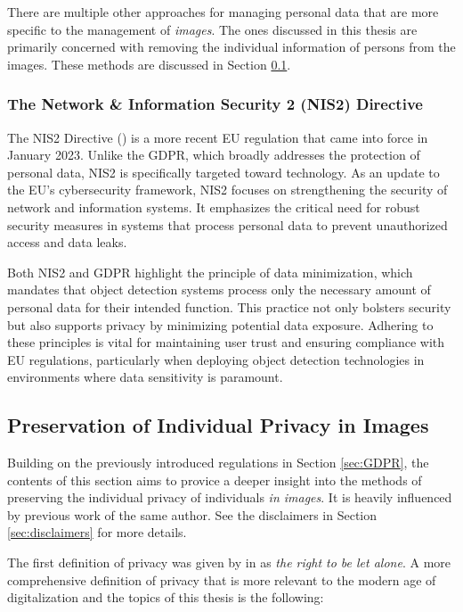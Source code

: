 There are multiple other approaches for managing personal data that are more specific to the management of \textit{images}. The ones discussed in this thesis are primarily concerned with removing the individual information of persons from the images. These methods are discussed in Section \ref{sec:individual_privacy}. 

\subsubsection{The Network \& Information Security 2 (NIS2) Directive}
\label{sec:NIS2_relevance}
    
The NIS2 Directive (\cite{eu2022nis2}) is a more recent EU regulation that came into force in January 2023. Unlike the GDPR, which broadly addresses the protection of personal data, NIS2 is specifically targeted toward technology. As an update to the EU's cybersecurity framework, NIS2 focuses on strengthening the security of network and information systems. It emphasizes the critical need for robust security measures in systems that process personal data to prevent unauthorized access and data leaks.

Both NIS2 and GDPR highlight the principle of data minimization, which mandates that object detection systems process only the necessary amount of personal data for their intended function. This practice not only bolsters security but also supports privacy by minimizing potential data exposure. Adhering to these principles is vital for maintaining user trust and ensuring compliance with EU regulations, particularly when deploying object detection technologies in environments where data sensitivity is paramount.

\subsection{Preservation of Individual Privacy in Images}
\label{sec:individual_privacy}
Building on the previously introduced regulations in Section \ref{sec:GDPR}, the contents of this section aims to provice a deeper insight into the methods of preserving the individual privacy of individuals \textit{in images}. It is heavily influenced by previous work of the same author. See the disclaimers in Section \ref{sec:disclaimers} for more details.

The first definition of privacy was given by \citeauthor{br1890righttoprivacy} in \citeyear{br1890righttoprivacy} as \textit{the right to be let alone}. A more comprehensive definition of privacy that is more relevant to the modern age of digitalization and the topics of this thesis is the following:

